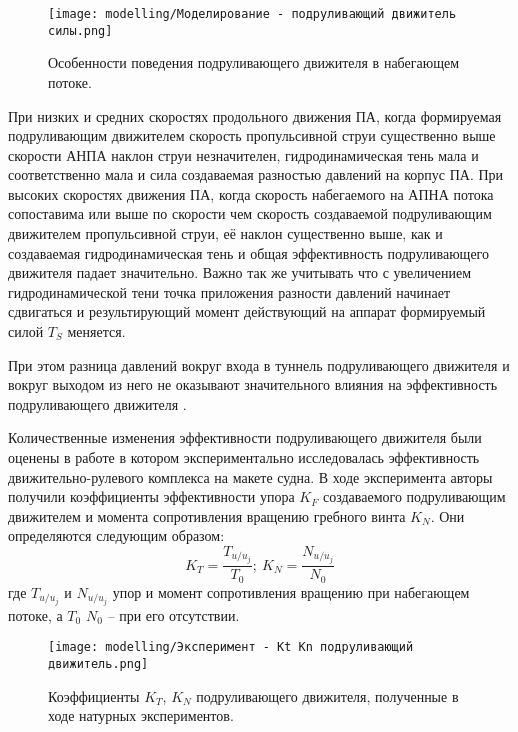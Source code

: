\begin{figure}[ht]
    \centering
    \texttt{[image: modelling/Моделирование - подруливающий движитель силы.png]}
    \caption{Особенности поведения подруливающего движителя в набегающем потоке.}
    \label{fig:modelling-tunnel}
\end{figure}

При низких и средних скоростях продольного движения ПА, когда формируемая подруливающим движителем скорость пропульсивной струи существенно выше скорости АНПА наклон струи незначителен, гидродинамическая тень мала и соответственно мала и сила создаваемая разностью давлений на корпус ПА.
При высоких скоростях движения ПА, когда скорость набегаемого на АПНА потока сопоставима или выше по скорости чем скорость создаваемой подруливающим движителем пропульсивной струи, её наклон существенно выше, как и создаваемая гидродинамическая тень и общая эффективность подруливающего движителя падает значительно.
Важно так же учитывать что с увеличением гидродинамической тени точка приложения разности давлений начинает сдвигаться и результирующий момент действующий на аппарат формируемый силой $T_S$ меняется.

При этом разница давлений вокруг входа в туннель подруливающего движителя и вокруг выходом из него не оказывают значительного влияния на эффективность подруливающего движителя \cite{brix1973lateral}.

Количественные изменения эффективности подруливающего движителя были оценены в работе \cite{chislett1966influence} в котором экспериментально исследовалась эффективность движительно-рулевого комплекса на макете судна.
В ходе эксперимента авторы получили коэффициенты эффективности упора $K_F$ создаваемого подруливающим движителем и момента сопротивления вращению гребного винта $K_N$.
Они определяются следующим образом:
\begin{equation*}
	K_T = \frac{T_{u/u_j}}{T_0}; \: K_N = \frac{N_{u/u_j}}{N_0}
\end{equation*}
\noindent где $T_{u/u_j}$ и $N_{u/u_j}$ упор и момент сопротивления вращению при набегающем потоке, а $T_0$ $N_0$ -- при его отсутствии.

\begin{figure}[ht]
    \centering
    \texttt{[image: modelling/Эксперимент - Kt Kn подруливающий движитель.png]}
    \caption{Коэффициенты $K_T$, $K_N$ подруливающего движителя, полученные в ходе натурных экспериментов.}
    \label{fig:tunnel_effectivness}
\end{figure}

